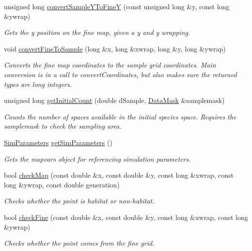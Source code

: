 \begin{DoxyCompactItemize}
unsigned long \hyperlink{class_landscape_a20bce25a388ec094f4c3fa8600c22545}{convert\+Sample\+Y\+To\+FineY} (const unsigned long \&y, const long \&ywrap)
\begin{DoxyCompactList}\small\item\em Gets the y position on the fine map, given a y and y wrapping. \end{DoxyCompactList}\item 
void \hyperlink{class_landscape_a33e5909b7d430caf0f4fb909ba3e0499}{convert\+Fine\+To\+Sample} (long \&x, long \&xwrap, long \&y, long \&ywrap)
\begin{DoxyCompactList}\small\item\em Converts the fine map coordinates to the sample grid coordinates. Main conversion is in a call to convert\+Coordinates, but also makes sure the returned types are long integers. \end{DoxyCompactList}\item 
unsigned long \hyperlink{class_landscape_ae8d533d9a8fff3a96c240aadaeac3f04}{get\+Initial\+Count} (double d\+Sample, \hyperlink{class_data_mask}{Data\+Mask} \&samplemask)
\begin{DoxyCompactList}\small\item\em Counts the number of spaces available in the initial species space. Requires the samplemask to check the sampling area. \end{DoxyCompactList}\item 
\hyperlink{struct_sim_parameters}{Sim\+Parameters} \hyperlink{class_landscape_a942f3e8837bf8862b7c110243279f160}{get\+Sim\+Parameters} ()
\begin{DoxyCompactList}\small\item\em Gets the mapvars object for referencing simulation parameters. \end{DoxyCompactList}\item 
bool \hyperlink{class_landscape_a24de83f1e8f762b9640cdba35793a404}{check\+Map} (const double \&x, const double \&y, const long \&xwrap, const long \&ywrap, const double generation)
\begin{DoxyCompactList}\small\item\em Checks whether the point is habitat or non-\/habitat. \end{DoxyCompactList}\item 
bool \hyperlink{class_landscape_a0545765b734539f622804bb3aa72e38c}{check\+Fine} (const double \&x, const double \&y, const long \&xwrap, const long \&ywrap)
\begin{DoxyCompactList}\small\item\em Checks whether the point comes from the fine grid. \end{DoxyCompactList}\item 

\end{DoxyCompactItemize}
